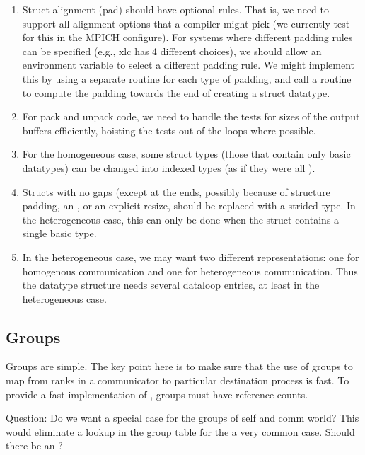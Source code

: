 \documentclass{article}
\begin{document}
\begin{enumerate}
\item Struct alignment (pad) should have optional rules.  That is, we
   need to support all alignment options that a compiler might pick
   (we currently test for this in the MPICH configure).  For systems
   where different padding rules can be specified (e.g., xlc has 4
   different choices), we should allow an environment variable to
   select a different padding rule.  We might implement this by using
   a separate routine for each type of padding, and call a routine to
   compute the padding towards the end of creating a struct datatype.

\item For pack and unpack code, we need to handle the tests for sizes of
    the output buffers efficiently, hoisting the tests out of the
    loops where possible.  

\item For the homogeneous case, some struct types (those that contain
    only basic datatypes) can be changed into indexed types (as if
    they were all ).

\item Structs with no gaps (except at the ends, possibly because of 
    structure padding, an , or an explicit resize,
    should be replaced with a strided type.  In the heterogeneous
    case, this can only be done when the struct contains a single
    basic type.

\item In the heterogeneous case, we may want two different
    representations: one for homogenous communication and one for
    heterogeneous communication.  Thus the datatype structure needs
    several dataloop entries, at least in the heterogeneous case.

\end{enumerate}

\subsection{Groups}

Groups are simple.  The key point here is to make sure that the use of
groups to map from ranks in a communicator to particular destination
process is fast.
To provide a fast implementation of , groups must
have reference counts.  

Question: Do we want a special case for the groups of self and comm
world?  This would eliminate a lookup in the group table for the a very
common case.  Should there be an ?  
\end{document}
